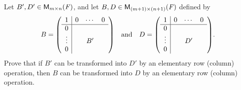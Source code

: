 \begin{ex}\label{ex:3.2.12}
  Let \(B', D' \in \ms\), and let \(B, D \in \ms[(m + 1)][(n + 1)][\F]\) defined by
  \[
    B = \pa{\begin{array}{c|ccc}
        1      & 0 & \cdots & 0 \\
        \hline
        0      &   &        &   \\
        \vdots &   & B'     &   \\
        0      &   &        &
      \end{array}} \quad \text{and} \quad D = \pa{\begin{array}{c|ccc}
        1      & 0 & \cdots & 0 \\
        \hline
        0      &   &        &   \\
        \vdots &   & D'     &   \\
        0      &   &        &
      \end{array}}.
  \]
  Prove that if \(B'\) can be transformed into \(D'\) by an elementary row (column) operation, then \(B\) can be transformed into \(D\) by an elementary row (column) operation.
\end{ex}

